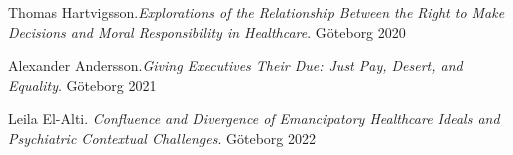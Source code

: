 \documentclass[fontsize=14pt,
               paper=297mm:210mm,
               twoside,
               pagesize=pdftex,
               DIV=calc
]{scrbook}
\begin{document}
\begin{multicols*}{2}
\begin{Volumes}
\item Thomas Hartvigsson.\enspace\textit{Explorations of the Relationship Between the Right to Make Decisions and Moral Responsibility in Healthcare}. \mbox{G\"oteborg} 2020

\item Alexander Andersson.\enspace\textit{Giving Executives Their Due: Just Pay, Desert, and Equality}. \mbox{G\"oteborg} 2021

\item Leila El-Alti.\enspace\textit{ Confluence and Divergence of Emancipatory Healthcare Ideals and Psychiatric Contextual Challenges}. \mbox{G\"oteborg} 2022
\end{Volumes}
\end{multicols*}
\end{document}
